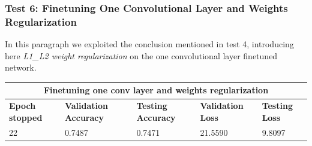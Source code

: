 \subsubsection{Test 6: Finetuning One Convolutional Layer and Weights Regularization}
In this paragraph we exploited the conclusion mentioned in test 4, introducing here \textit{L1\_L2 weight regularization} on the one convolutional layer finetuned network.


\medskip

\begin{tabular}{ |p{2cm}|p{2cm}|p{2cm}|p{2cm}|p{2cm}|  }
\hline
\multicolumn{5}{|c|}{Finetuning one conv layer and weights regularization} \\
\hline
\textbf{Epoch stopped} & \textbf{Validation Accuracy} & \textbf{Testing Accuracy} & \textbf{Validation Loss} & \textbf{Testing Loss} \\
\hline
22& 0.7487 & 0.7471 & 21.5590 & 9.8097\\
\hline
\end{tabular}

\medskip

